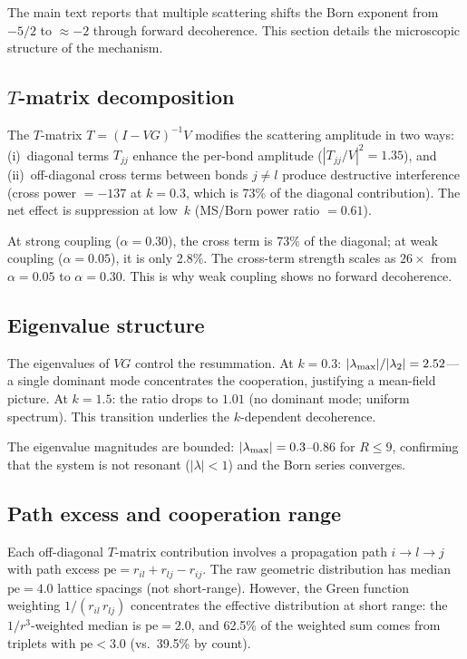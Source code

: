 \documentclass[11pt]{article}
\begin{document}
The main text reports that multiple scattering shifts the Born exponent from
$-5/2$ to $\approx -2$ through forward decoherence. This section details
the microscopic structure of the mechanism.

\subsection{$T$-matrix decomposition}

The $T$-matrix $T = (I - VG)^{-1}V$ modifies the scattering amplitude in two
ways: (i)~diagonal terms $T_{jj}$ enhance the per-bond amplitude
($|T_{jj}/V|^2 = 1.35$), and (ii)~off-diagonal cross terms between bonds
$j \neq l$ produce destructive interference (cross power $= -137$ at
$k = 0.3$, which is 73\% of the diagonal contribution). The net effect is
suppression at low~$k$ (MS/Born power ratio $= 0.61$).

At strong coupling ($\alpha = 0.30$), the cross term is 73\% of the diagonal;
at weak coupling ($\alpha = 0.05$), it is only 2.8\%. The cross-term
strength scales as $26\times$ from $\alpha = 0.05$ to $\alpha = 0.30$. This
is why weak coupling shows no forward decoherence.

\subsection{Eigenvalue structure}

The eigenvalues of $VG$ control the resummation. At $k = 0.3$:
$|\lambda_{\rm max}|/|\lambda_2| = 2.52$---a single dominant mode concentrates
the cooperation, justifying a mean-field picture. At $k = 1.5$: the ratio drops
to $1.01$ (no dominant mode; uniform spectrum). This transition underlies the
$k$-dependent decoherence.

The eigenvalue magnitudes are bounded: $|\lambda_{\rm max}| = 0.3$--$0.86$ for
$R \leq 9$, confirming that the system is not resonant ($|\lambda| < 1$) and
the Born series converges.

\subsection{Path excess and cooperation range}

Each off-diagonal $T$-matrix contribution involves a propagation path
$i \to l \to j$ with path excess $\mathrm{pe} = r_{il} + r_{lj} - r_{ij}$. The
raw geometric distribution has median $\mathrm{pe} = 4.0$ lattice spacings (not
short-range). However, the Green function weighting $1/(r_{il}\,r_{lj})$
concentrates the effective distribution at short range: the $1/r^3$-weighted
median is $\mathrm{pe} = 2.0$, and 62.5\% of the weighted sum comes from
triplets with $\mathrm{pe} < 3.0$ (vs.\ 39.5\% by count).
\end{document}
